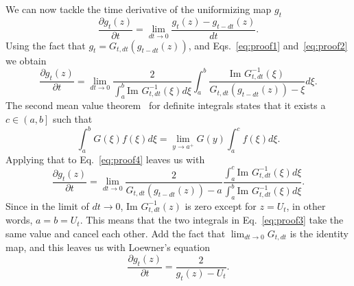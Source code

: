 We can now tackle the time derivative of the uniformizing map $g_t$
\begin{equation}
    \frac{\partial g_{t}\left(z\right)}{\partial t}=
    \lim_{dt\rightarrow0}\frac{g_{t}\left(z\right)-g_{t-dt}\left(z\right)}{dt}.
\end{equation}
Using the fact that $g_{t}=G_{t,dt}\left(g_{t-dt}\left(z\right)\right)$,
and Eqs.~\ref{eq:proof1} and~\ref{eq:proof2} we obtain
\begin{equation}
    \frac{\partial g_{t}\left(z\right)}{\partial t}=
    \lim_{dt\rightarrow0}\frac{2}
    {\int_{a}^{b}\mbox{Im }G_{t,dt}^{-1}\left(\xi\right)d\xi}
    \int_{a}^{b}
    \frac{\mbox{Im }G_{t,dt}^{-1}\left(\xi\right)}
    {G_{t,dt}\left(g_{t-dt}\left(z\right)\right)-\xi}d\xi.
    \label{eq:proof4}
\end{equation}
The second mean value theorem~\cite{Comenetz2002} for definite integrals states that
it exists a $c\in\left(a,b\right]$ such that
\begin{equation}
    \int_{a}^{b}G\left(\xi\right)f\left(\xi\right)d\xi=
    \lim_{y\rightarrow a^+}G\left(y\right)\int_{a}^{c}f\left(\xi\right)d\xi.
\end{equation}
Applying that to Eq.~\ref{eq:proof4} leaves us with
\begin{equation}
    \label{eq:proof3}
     \frac{\partial g_{t}\left(z\right)}{\partial t}=
     \lim_{dt\rightarrow0}
     \frac{2}{G_{t,dt}\left(g_{t-dt}\left(z\right)\right)-a}
     \frac{\int_{a}^{c}\mbox{Im }G_{t,dt}^{-1}\left(\xi\right)d\xi}
          {\int_{a}^{b}\mbox{Im }G_{t,dt}^{-1}\left(\xi\right)d\xi}.
\end{equation}
Since in the limit of $dt\rightarrow0$, $\mbox{Im }G_{t,dt}^{-1}(z)$ is
zero except for $z=U_t$, in other words, $a=b=U_t$. This means that the two
integrals in Eq.~\ref{eq:proof3} take the same value and cancel each other. Add
the fact that $\lim_{dt\rightarrow 0}G_{t,dt}$ is the identity map, and
this leaves us with Loewner's equation
\begin{equation}
    \frac{\partial g_t(z)}{\partial t} = \frac{2}{g_t(z) - U_t}.
\end{equation}

